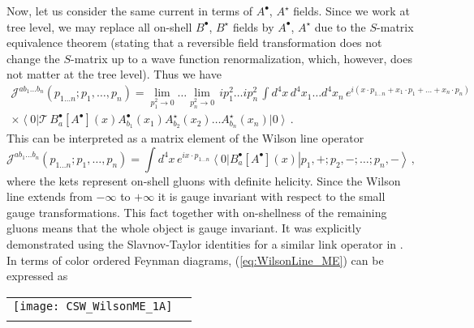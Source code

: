 \documentclass[english,american]{article}
\newcommand\myref{\refstepcounter{equation}\theequation}
\newcommand{\refmyref}[1]{\newcounter{#1}\setcounter{#1}{\theequation}}
\begin{document}
Now, let us consider the same current in terms of $A^{\bullet}$,
$A^{\star}$ fields. Since we work at tree level, we may replace all
on-shell $B^{\bullet}$, $B^{\star}$ fields by $A^{\bullet}$, $A^{\star}$
due to the $S$-matrix equivalence theorem (stating that a reversible
field transformation does not change the $S$-matrix up to a wave function
renormalization, which, however, does not matter at the tree level). Thus
we have
\begin{multline}
\mathcal{J}^{ab_{1}\dots b_{n}}\left(p_{1\dots n};p_{1},\dots,p_{n}\right)=\lim_{p_{1}^{2}\rightarrow0}\dots\lim_{p_{n}^{2}\rightarrow0}\, ip_{1}^{2}\dots ip_{n}^{2}\,\int d^{4}x\, d^{4}x_{1}\dots d^{4}x_{n}\, e^{i\left(x\cdot p_{1\dots n}+x_{1}\cdot p_{1}+\dots+x_{n}\cdot p_{n}\right)}\\
\times\left\langle 0\right|\mathcal{T}\, B_{a}^{\bullet}\left[A^{\bullet}\right]\left(x\right)A_{b_{1}}^{\bullet}\left(x_{1}\right)A_{b_{2}}^{\star}\left(x_{2}\right)\dots A_{b_{n}}^{\star}\left(x_{n}\right)\left|0\right\rangle \, .
\end{multline}
This can be interpreted as a matrix element of the Wilson line operator
\begin{equation}
\mathcal{J}^{ab_{1}\dots b_{n}}\left(p_{1\dots n};p_{1},\dots,p_{n}\right)=\int d^{4}x\, e^{ix\cdot p_{1\dots n}}\left\langle 0\right|B_{a}^{\bullet}\left[A^{\bullet}\right]\left(x\right)\left|p_{1},+;p_{2},-;\dots;p_{n},-\right\rangle \,,\label{eq:WilsonLine_ME}
\end{equation}
where the kets represent on-shell gluons with definite helicity. Since
the Wilson line extends from $-\infty$ to $+\infty$ it is gauge
invariant with respect to the small gauge transformations. This fact together
with on-shellness of the remaining gluons means that the whole object
is gauge invariant. It was explicitly demonstrated using the Slavnov-Taylor
identities for a similar link operator in \citep{Kotko2014a}. In
terms of color ordered Feynman diagrams, (\ref{eq:WilsonLine_ME})
can be expressed as

\begin{flushleft}
\begin{tabular}{>{\raggedleft}m{}>{\centering}m{}}
\bigskip{}


\raggedright{}\centerline{\texttt{[image: CSW\_WilsonME\_1A]}} & \centering{}\tabularnewline
\raggedright{}\flushright{\texttt{[image: CSW\_WilsonME\_1B]}} & \centering{}\centering{(\myref )}
\refmyref{WLME_diag_1}\tabularnewline
\end{tabular}
\par\end{flushleft}
\end{document}
